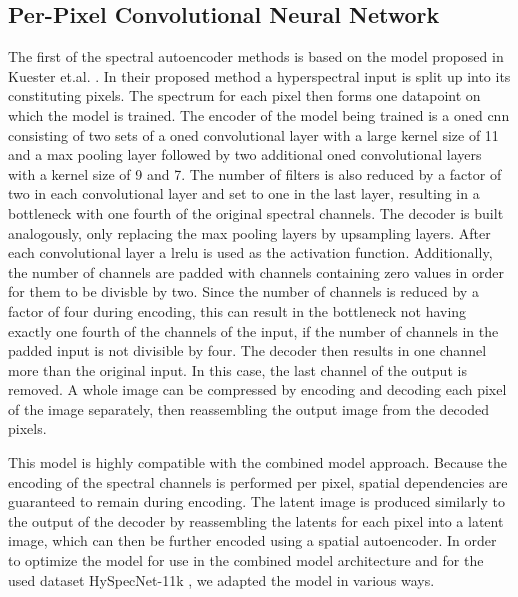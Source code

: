 \subsection{Per-Pixel Convolutional Neural Network\label{sec:conv1d}}
The first of the spectral autoencoder methods is based on the model proposed in Kuester et.al. \citep{kuester_1d-convolutional_2021,kuester_transferability_2022}. In their proposed method a hyperspectral input is split up into its constituting pixels. The spectrum for each pixel then forms one datapoint on which the model is trained. The encoder of the model being trained is a \ac{oned} \ac{cnn} consisting of two sets of a \ac{oned} convolutional layer with a large kernel size of 11 and a max pooling layer followed by two additional \ac{oned} convolutional layers with a kernel size of 9 and 7. The number of filters is also reduced by a factor of two in each convolutional layer and set to one in the last layer, resulting in a bottleneck with one fourth of the original spectral channels. The decoder is built analogously, only replacing the max pooling layers by upsampling layers. After each convolutional layer a \ac{lrelu} is used as the activation function. Additionally, the number of channels are padded with channels containing zero values in order for them to be divisble by two. Since the number of channels is reduced by a factor of four during encoding, this can result in the bottleneck not having exactly one fourth of the channels of the input, if the number of channels in the padded input is not divisible by four. The decoder then results in one channel more than the original input. In this case, the last channel of the output is removed. A whole image can be compressed by encoding and decoding each pixel of the image separately, then reassembling the output image from the decoded pixels.

This model is highly compatible with the combined model approach. Because the encoding of the spectral channels is performed per pixel, spatial dependencies are guaranteed to remain during encoding. The latent image is produced similarly to the output of the decoder by reassembling the latents for each pixel into a latent image, which can then be further encoded using a spatial autoencoder. In order to optimize the model for use in the combined model architecture and for the used dataset HySpecNet-11k \citep{fuchs_hyspecnet-11k_2023}, we adapted the model in various ways.

